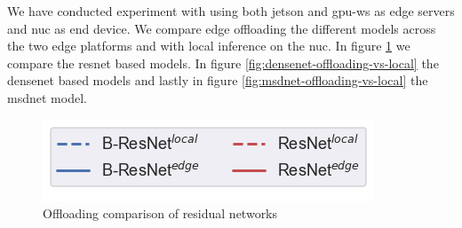 We have conducted experiment with using both \gls{jetson} and \gls{gpu-ws} as edge servers and \gls{nuc} as end device. We compare edge offloading the different models across the two edge platforms and with local inference on the \gls{nuc}. In figure \ref{fig:resnet-offloading-vs-local} we compare the \gls{resnet} based models. In figure \ref{fig:densenet-offloading-vs-local} the \gls{densenet} based models and lastly in figure \ref{fig:msdnet-offloading-vs-local} the \gls{msdnet} model.

\begin{figure}
	\captionsetup[subfigure]{justification=centering, farskip=0pt,captionskip=0pt}
	\centering
	\includegraphics[width=.3\linewidth]{figures/edge/gpu_b-resnet_offloading_vs_local_legend}
	\hfill
	\hfill
	\caption[Offloading comparison of residual networks]{Offloading comparison of residual networks}
	\label{fig:resnet-offloading-vs-local}
\end{figure}

